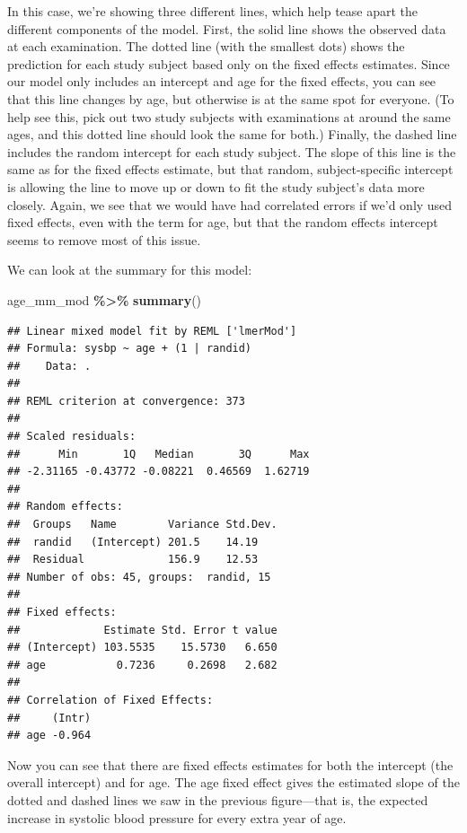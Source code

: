 \documentclass[
]{book}
\newenvironment{Shaded}{\begin{snugshade}}{\end{snugshade}}
\newcommand{\FunctionTok}[1]{\textcolor[rgb]{0.13,0.29,0.53}{\textbf{#1}}}
\newcommand{\NormalTok}[1]{#1}
\newcommand{\SpecialCharTok}[1]{\textcolor[rgb]{0.81,0.36,0.00}{\textbf{#1}}}
\begin{document}
In this case, we're showing three different lines, which help tease apart the
different components of the model. First, the solid line shows the observed data
at each examination. The dotted line (with the smallest dots) shows the
prediction for each study subject based only on the fixed effects estimates.
Since our model only includes an intercept and age for the fixed effects, you
can see that this line changes by age, but otherwise is at the same spot for
everyone. (To help see this, pick out two study subjects with examinations at
around the same ages, and this dotted line should look the same for both.)
Finally, the dashed line includes the random intercept for each study subject.
The slope of this line is the same as for the fixed effects estimate, but that
random, subject-specific intercept is allowing the line to move up or down to
fit the study subject's data more closely. Again, we see that we would have
had correlated errors if we'd only used fixed effects, even with the term for
age, but that the random effects intercept seems to remove most of this issue.

We can look at the summary for this model:

\begin{Shaded}
\begin{Highlighting}[]
\NormalTok{age\_mm\_mod }\SpecialCharTok{\%\textgreater{}\%} 
  \FunctionTok{summary}\NormalTok{()}
\end{Highlighting}
\end{Shaded}

\begin{verbatim}
## Linear mixed model fit by REML ['lmerMod']
## Formula: sysbp ~ age + (1 | randid)
##    Data: .
## 
## REML criterion at convergence: 373
## 
## Scaled residuals: 
##      Min       1Q   Median       3Q      Max 
## -2.31165 -0.43772 -0.08221  0.46569  1.62719 
## 
## Random effects:
##  Groups   Name        Variance Std.Dev.
##  randid   (Intercept) 201.5    14.19   
##  Residual             156.9    12.53   
## Number of obs: 45, groups:  randid, 15
## 
## Fixed effects:
##             Estimate Std. Error t value
## (Intercept) 103.5535    15.5730   6.650
## age           0.7236     0.2698   2.682
## 
## Correlation of Fixed Effects:
##     (Intr)
## age -0.964
\end{verbatim}

Now you can see that there are fixed effects estimates for both the intercept
(the overall intercept) and for age. The age fixed effect gives the estimated
slope of the dotted and dashed lines we saw in the previous figure---that is,
the expected increase in systolic blood pressure for every extra year of age.
\end{document}
